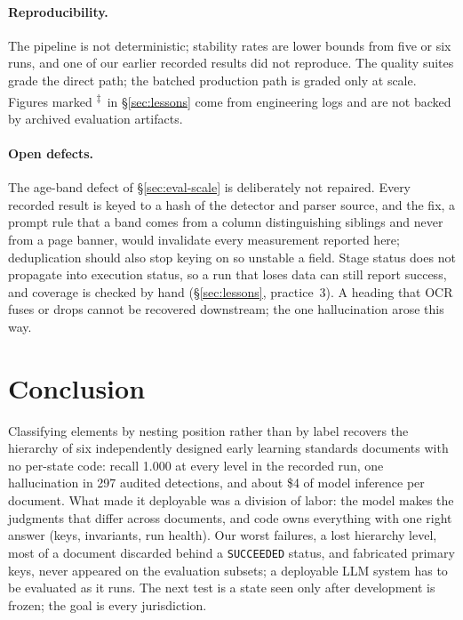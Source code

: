 \documentclass[letterpaper]{article} %
\newcommand{\elog}{\textsuperscript{$\ddagger$}}
\begin{document}
\paragraph{Reproducibility.} The pipeline is not deterministic; stability
rates are lower bounds from five or six runs, and one of our earlier recorded
results did not reproduce. The quality suites grade the direct path; the
batched production path is graded only at scale. Figures marked \elog\ in
\S\ref{sec:lessons} come from engineering logs and are not backed by archived
evaluation artifacts.

\paragraph{Open defects.} The age-band defect of \S\ref{sec:eval-scale} is
deliberately not repaired. Every recorded result is keyed to a hash of the
detector and parser source, and the fix, a prompt rule that a band comes from a
column distinguishing siblings and never from a page banner, would invalidate
every measurement reported here; deduplication should also stop keying on so
unstable a field. Stage status does not propagate into execution status, so a
run that loses data can still report success, and coverage is checked by hand
(\S\ref{sec:lessons}, practice~3). A heading that OCR fuses or drops cannot be
recovered downstream; the one hallucination arose this way.

\section{Conclusion}
\label{sec:conclusion}

Classifying elements by nesting position rather than by label recovers the
hierarchy of six independently designed early learning standards documents
with no per-state code: recall 1.000 at every level in the recorded run, one
hallucination in 297 audited detections, and about \$4 of model inference per
document. What made it deployable was a division of labor: the model makes the
judgments that differ across documents, and code owns everything with one
right answer (keys, invariants, run health). Our worst failures, a lost
hierarchy level, most of a document discarded behind a \texttt{SUCCEEDED}
status, and fabricated primary keys, never appeared on the evaluation subsets;
a deployable LLM system has to be evaluated as it runs. The next test is a
state seen only after development is frozen; the goal is every jurisdiction.
\end{document}
